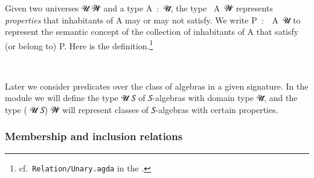 Given two universes \ab 𝓤 \ab 𝓦 and a type \ab A~\as :~\ab 𝓤\af ̇, the type ~\ab A~\ab 𝓦 represents \emph{properties} that inhabitants of \ab A may or may not satisfy.  We write \ab P~\as :~~\ab A~\ab 𝓤 to represent the semantic concept of the collection of inhabitants of \ab A that satisfy (or belong to) \ab P. Here is the definition.\footnote{\label{relunary}cf.~\texttt{Relation/Unary.agda} in the \agdastdlib.}
\ccpad
\begin{code}%
\>[0][@{}l@{\AgdaIndent{0}}]%
\>[1]\AgdaSpace{}%
\AgdaSymbol{:}\AgdaSpace{}%
%
\AgdaSpace{}%
\AgdaSpace{}%
\AgdaSymbol{(}\AgdaSpace{}%
\AgdaSymbol{:}\AgdaSpace{}%
\AgdaSymbol{)}\AgdaSpace{}%
\AgdaSpace{}%
\AgdaSpace{}%
\AgdaSpace{}%
\AgdaSpace{}%
%
\<%
\\
%
\>[1]\AgdaSpace{}%
\AgdaSpace{}%
\AgdaSpace{}%
\AgdaSymbol{=}\AgdaSpace{}%
\AgdaSpace{}%
\AgdaSpace{}%
%
\<%
\end{code}
\ccpad
Later we consider predicates over the class of algebras in a given signature. In the  module we will define the type  \ab 𝓤 \ab 𝑆 of \ab 𝑆-algebras with domain type \ab 𝓤\af ̇, and the type  ( \ab 𝓤 \ab 𝑆) \ab 𝓦 will represent classes of \ab 𝑆-algebras with certain properties.





\subsubsection{Membership and inclusion relations}\label{membership-and-inclusion-relations}

